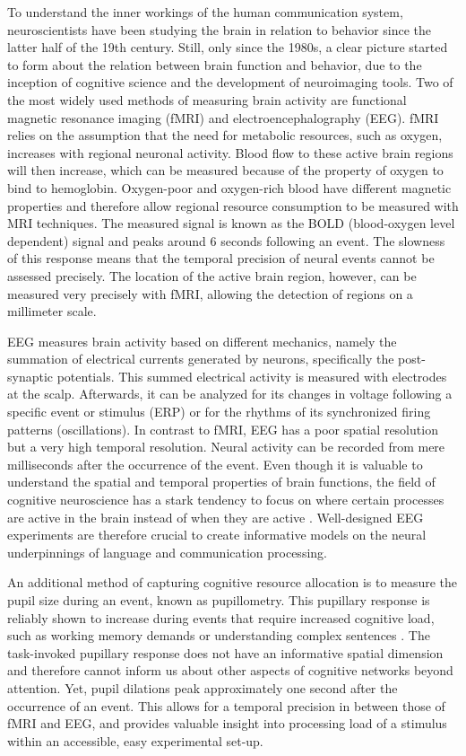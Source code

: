 To understand the inner workings of the human communication system, neuroscientists have been studying the brain in relation to behavior since the latter half of the 19th century. Still, only since the 1980s, a clear picture started to form about the relation between brain function and behavior, due to the inception of cognitive science and the development of neuroimaging tools. Two of the most widely used methods of measuring brain activity are functional magnetic resonance imaging (fMRI) and electroencephalography (EEG). fMRI relies on the assumption that the need for metabolic resources, such as oxygen, increases with regional neuronal activity. Blood flow to these active brain regions will then increase, which can be measured because of the property of oxygen to bind to hemoglobin. Oxygen-poor and oxygen-rich blood have different magnetic properties and therefore allow regional resource consumption to be measured with MRI techniques. The measured signal is known as the BOLD (blood-oxygen level dependent) signal and peaks around 6 seconds following an event. The slowness of this response means that the temporal precision of neural events cannot be assessed precisely. The location of the active brain region, however, can be measured very precisely with fMRI, allowing the detection of regions on a millimeter scale. 

EEG measures brain activity based on different mechanics, namely the summation of electrical currents generated by neurons, specifically the post-synaptic potentials. This summed electrical activity is measured with electrodes at the scalp. Afterwards, it can be analyzed for its changes in voltage following a specific event or stimulus (ERP) or for the rhythms of its synchronized firing patterns (oscillations). In contrast to fMRI, EEG has a poor spatial resolution but a very high temporal resolution. Neural activity can be recorded from mere milliseconds after the occurrence of the event. Even though it is valuable to understand the spatial and temporal properties of brain functions, the field of cognitive neuroscience has a stark tendency to focus on where certain processes are active in the brain instead of when they are active \citep{poeppel2012}. Well-designed EEG experiments are therefore crucial to create informative models on the neural underpinnings of language and communication processing.  


An additional method of capturing cognitive resource allocation is to measure the pupil size during an event, known as pupillometry. This pupillary response is reliably shown to increase during events that require increased cognitive load, such as working memory demands or understanding complex sentences \citep{beatty1982}. The task-invoked pupillary response does not have an informative spatial dimension and therefore cannot inform us about other aspects of cognitive networks beyond attention. Yet, pupil dilations peak approximately one second after the occurrence of an event. This allows for a temporal precision in between those of fMRI and EEG, and provides valuable insight into processing load of a stimulus within an accessible, easy experimental set-up. 

